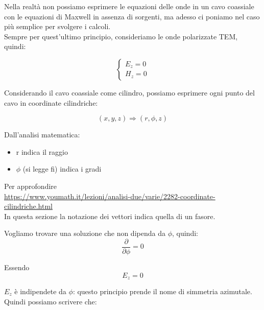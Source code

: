 Nella realtà non possiamo esprimere le equazioni delle onde in un cavo coassiale 
con le equazioni di Maxwell in assenza di sorgenti, ma adesso ci poniamo nel caso più 
semplice per svolgere i calcoli. \\ 

Sempre per quest'ultimo principio, consideriamo le onde polarizzate TEM, quindi: 

{\Large \begin{equation}
    \begin{cases}
        E_z = 0 \\ 
        H_z = 0
    \end{cases}
\end{equation}}

Considerando il cavo coassiale come cilindro, possiamo esprimere ogni punto del cavo 
in coordinate cilindriche: 

{\Large \begin{equation}
    (x, y, z) \Rightarrow (r, \phi, z )
\end{equation}}

\begin{tcolorbox}
    Dall'analisi matematica: 
    \begin{itemize}
        \item r indica il raggio 
        \item $\phi$ (si legge fi) indica i gradi  
    \end{itemize}
    Per approfondire\\
    \url{https://www.youmath.it/lezioni/analisi-due/varie/2282-coordinate-cilindriche.html} \\ 

    In questa sezione la notazione dei vettori indica quella di un fasore. 
\end{tcolorbox}

Vogliamo trovare una soluzione che non dipenda 
da $\phi$, quindi:
{\Large \begin{equation}
    \frac{\partial}{\partial \phi} = 0
\end{equation}} 

Essendo 
{
    \Large
     \begin{equation}
  E_z = 0      
     \end{equation}
}

$E_z$ è indipendete da $\phi$: 
questo principio prende il nome di simmetria azimutale. \\ 

Quindi possiamo scrivere che: 

